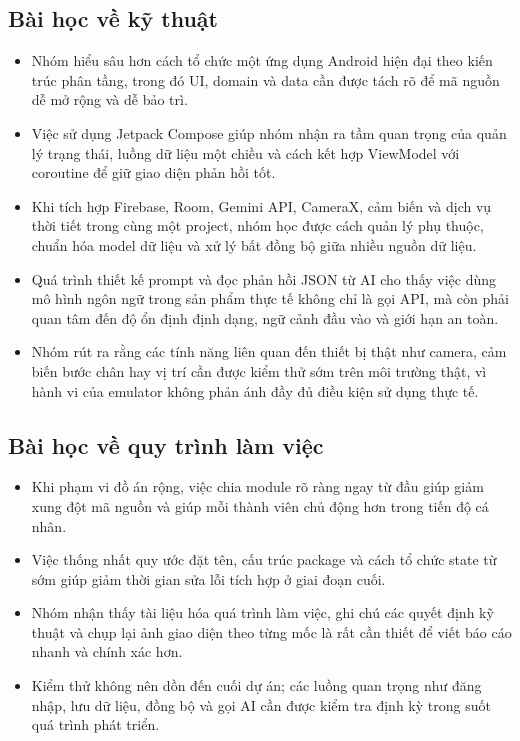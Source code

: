\documentclass{zenbuddy-report}
\begin{document}
\subsection{Bài học về kỹ thuật}
\begin{itemize}
  \item Nhóm hiểu sâu hơn cách tổ chức một ứng dụng Android hiện đại theo kiến trúc phân tầng, trong đó UI, domain và data cần được tách rõ để mã nguồn dễ mở rộng và dễ bảo trì.
  \item Việc sử dụng Jetpack Compose giúp nhóm nhận ra tầm quan trọng của quản lý trạng thái, luồng dữ liệu một chiều và cách kết hợp ViewModel với coroutine để giữ giao diện phản hồi tốt.
  \item Khi tích hợp Firebase, Room, Gemini API, CameraX, cảm biến và dịch vụ thời tiết trong cùng một project, nhóm học được cách quản lý phụ thuộc, chuẩn hóa model dữ liệu và xử lý bất đồng bộ giữa nhiều nguồn dữ liệu.
  \item Quá trình thiết kế prompt và đọc phản hồi JSON từ AI cho thấy việc dùng mô hình ngôn ngữ trong sản phẩm thực tế không chỉ là gọi API, mà còn phải quan tâm đến độ ổn định định dạng, ngữ cảnh đầu vào và giới hạn an toàn.
  \item Nhóm rút ra rằng các tính năng liên quan đến thiết bị thật như camera, cảm biến bước chân hay vị trí cần được kiểm thử sớm trên môi trường thật, vì hành vi của emulator không phản ánh đầy đủ điều kiện sử dụng thực tế.
\end{itemize}

\subsection{Bài học về quy trình làm việc}
\begin{itemize}
  \item Khi phạm vi đồ án rộng, việc chia module rõ ràng ngay từ đầu giúp giảm xung đột mã nguồn và giúp mỗi thành viên chủ động hơn trong tiến độ cá nhân.
  \item Việc thống nhất quy ước đặt tên, cấu trúc package và cách tổ chức state từ sớm giúp giảm thời gian sửa lỗi tích hợp ở giai đoạn cuối.
  \item Nhóm nhận thấy tài liệu hóa quá trình làm việc, ghi chú các quyết định kỹ thuật và chụp lại ảnh giao diện theo từng mốc là rất cần thiết để viết báo cáo nhanh và chính xác hơn.
  \item Kiểm thử không nên dồn đến cuối dự án; các luồng quan trọng như đăng nhập, lưu dữ liệu, đồng bộ và gọi AI cần được kiểm tra định kỳ trong suốt quá trình phát triển.
\end{itemize}
\end{document}
